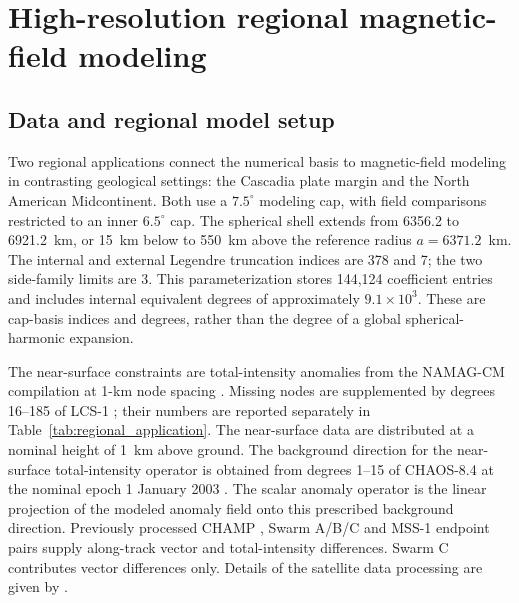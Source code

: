 ﻿\documentclass[11pt,a4paper]{article}
\begin{document}
\section{High-resolution regional magnetic-field modeling}
\label{sec:application}

\subsection{Data and regional model setup}

Two regional applications connect the numerical basis to magnetic-field modeling in contrasting geological settings: the Cascadia plate margin and the North American Midcontinent. Both use a $7.5^\circ$ modeling cap, with field comparisons restricted to an inner $6.5^\circ$ cap. The spherical shell extends from 6356.2 to 6921.2~km, or 15~km below to 550~km above the reference radius $a=6371.2$~km. The internal and external Legendre truncation indices are 378 and 7; the two side-family limits are 3. This parameterization stores 144,124 coefficient entries and includes internal equivalent degrees of approximately $9.1\times10^3$. These are cap-basis indices and degrees, rather than the degree of a global spherical-harmonic expansion.

The near-surface constraints are total-intensity anomalies from the NAMAG-CM compilation at 1-km node spacing \citep{NAMAGCMData}. Missing nodes are supplemented by degrees 16--185 of LCS-1 \citep{OlsenEtAl2017LCS1}; their numbers are reported separately in Table~\ref{tab:regional_application}. The near-surface data are distributed at a nominal height of 1~km above ground. The background direction for the near-surface total-intensity operator is obtained from degrees 1--15 of CHAOS-8.4 at the nominal epoch 1 January 2003 \citep{KlossEtAl2026CHAOS8,CHAOS84Data}. The scalar anomaly operator is the linear projection of the modeled anomaly field onto this prescribed background direction. Previously processed CHAMP \citep{Maus2007CHAMP,CHAMPData}, Swarm A/B/C \citep{FriisChristensenEtAl2006Swarm,SwarmData} and MSS-1 \citep{Zhang2023MSS1,MSS1Data} endpoint pairs supply along-track vector and total-intensity differences. Swarm C contributes vector differences only. Details of the satellite data processing are given by \citet{ZhangEtAl2025EPP}.
\end{document}
